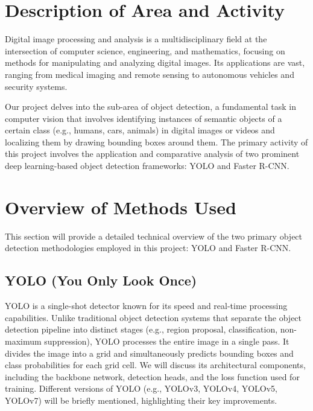 \documentclass[12pt,a4paper]{article}
\begin{document}
\newpage %

\section{Description of Area and Activity}
\label{sec:intro}

Digital image processing and analysis is a multidisciplinary field at the intersection of computer science, engineering, and mathematics, focusing on methods for manipulating and analyzing digital images. Its applications are vast, ranging from medical imaging and remote sensing to autonomous vehicles and security systems.

Our project delves into the sub-area of object detection, a fundamental task in computer vision that involves identifying instances of semantic objects of a certain class (e.g., humans, cars, animals) in digital images or videos and localizing them by drawing bounding boxes around them. The primary activity of this project involves the application and comparative analysis of two prominent deep learning-based object detection frameworks: YOLO and Faster R-CNN.

\section{Overview of Methods Used}
\label{sec:methods}

This section will provide a detailed technical overview of the two primary object detection methodologies employed in this project: YOLO and Faster R-CNN.

\subsection{YOLO (You Only Look Once)}
\label{ssec:yolo}
YOLO is a single-shot detector known for its speed and real-time processing capabilities. Unlike traditional object detection systems that separate the object detection pipeline into distinct stages (e.g., region proposal, classification, non-maximum suppression), YOLO processes the entire image in a single pass. It divides the image into a grid and simultaneously predicts bounding boxes and class probabilities for each grid cell. We will discuss its architectural components, including the backbone network, detection heads, and the loss function used for training. Different versions of YOLO (e.g., YOLOv3, YOLOv4, YOLOv5, YOLOv7) will be briefly mentioned, highlighting their key improvements.
\end{document}
